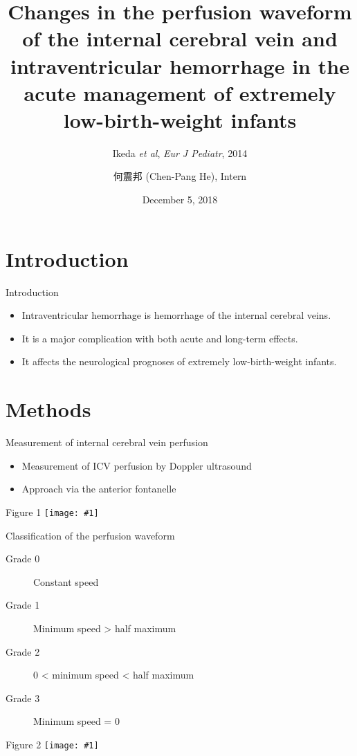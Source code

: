 \documentclass{beamer}
\title[(Ikeda \textit{et al}, 2018)]{
    Changes in the perfusion waveform of the internal cerebral vein and
    intraventricular hemorrhage in the acute management of extremely
    low-birth-weight infants
}
\subtitle{Ikeda \textit{et al}, \textit{Eur J Pediatr}, 2014}
\author[Chen-Pang He]{何震邦 (Chen-Pang He), Intern}
\date{December 5, 2018}
\institute[CGH]{Cathay General Hospital}
\newcommand*{\solo}[1]{\centering\texttt{[image: \#1]}}
\begin{document}
\maketitle

\section{Introduction}
\begin{frame}{Introduction}
    \begin{itemize}
        \item Intraventricular hemorrhage is hemorrhage of the internal cerebral veins.
        \item It is a major complication with both acute and long-term effects.
        \item It affects the neurological prognoses of extremely low-birth-weight infants.
    \end{itemize}
\end{frame}

\section{Methods}
\begin{frame}{Measurement of internal cerebral vein perfusion}
    \begin{itemize}
        \item Measurement of ICV perfusion by Doppler ultrasound
        \item Approach via the anterior fontanelle
    \end{itemize}
\end{frame}

\begin{frame}{Figure 1}
    \solo{F1.png}
\end{frame}

\begin{frame}{Classification of the perfusion waveform}
    \begin{description}
        \item[Grade 0] Constant speed
        \item[Grade 1] Minimum speed > half maximum
        \item[Grade 2] 0 < minimum speed < half maximum
        \item[Grade 3] Minimum speed = 0
    \end{description}
\end{frame}

\begin{frame}{Figure 2}
    \solo{F2.png}
\end{frame}
\end{document}
